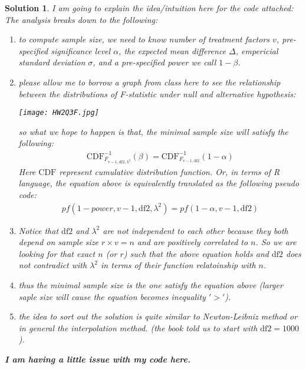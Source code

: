 \documentclass[11pt]{article}
\newtheorem{sol}{Solution}
\begin{document}
\begin{sol}
	I am going to explain the idea/intuition here for the code attached:\vskip 2mm
	The analysis breaks down to the following:
	\begin{enumerate}
		\item to compute sample size, we need to know number of treatment factors $v$, pre-specified significance level $\alpha$, the expected mean difference $\Delta$, empericial standard deviation $\sigma$, and a pre-specified power we call $1 - \beta$.
		\item please allow me to borrow a graph from class here to see the relationship between the distributions of F-statistic under null and alternative hypothesis:\vskip 2mm
		\begin{center}
			\texttt{[image: HW2Q3F.jpg]}
		\end{center}
		so what we hope to happen is that, the minimal sample size will satisfy the following:
		\begin{align*}
		 	\text{CDF}^{-1}_{F_{v-1, \text{df}2, \lambda^2}}(\beta) = \text{CDF}^{-1}_{F_{v-1, \text{df}2}}(1 - \alpha)
		\end{align*}
		Here $\text{CDF}$ represent cumulative distribution function.  Or, in terms of R language, the equation above is equivalently translated as the following pseudo code:
		\begin{align*}
			pf(1 - power, v-1, \text{df}2, \lambda^2) = pf(1 - \alpha, v-1, \text{df}2)
		\end{align*}
		\item Notice that $\text{df}2$ and $\lambda^2$ are not independent to each other because they both depend on sample size $r \times v = n$ and are positively correlated to $n$. So we are looking for that exact $n$ (or $r$) such that the above equation holds and $\text{df}2$ does not contradict with $\lambda^2$ in terms of their function relatoinship with $n$.\vskip 2mm
		\item thus the minimal sample size is the one satisfy the equation above (larger saple size will cause the equation becomes inequality $'>'$). 
		\item the idea to sort out the solution is quite similar to Newton-Leibniz method or in general the interpolation method. (the book told us to start with $\text{df2} = 1000$).
		\end{enumerate}
		{\bf I am having a little issue with my code here.} 
\end{sol}
\vskip 2mm
\end{document}
